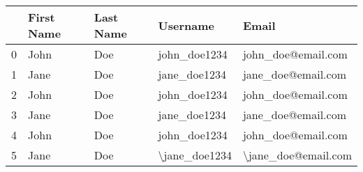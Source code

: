 \begin{tabular}{lllll}
\toprule
{} & First Name & Last Name &       Username &                Email \\
\midrule
0 &       John &       Doe &   john\_doe1234 &   john\_doe@email.com \\
1 &       Jane &       Doe &   jane\_doe1234 &   jane\_doe@email.com \\
2 &       John &       Doe &   john\_doe1234 &   john\_doe@email.com \\
3 &       Jane &       Doe &   jane\_doe1234 &   jane\_doe@email.com \\
4 &       John &       Doe &   john\_doe1234 &   john\_doe@email.com \\
5 &       Jane &       Doe &  \textbackslash jane\_doe1234 &  \textbackslash jane\_doe@email.com \\
\bottomrule
\end{tabular}
